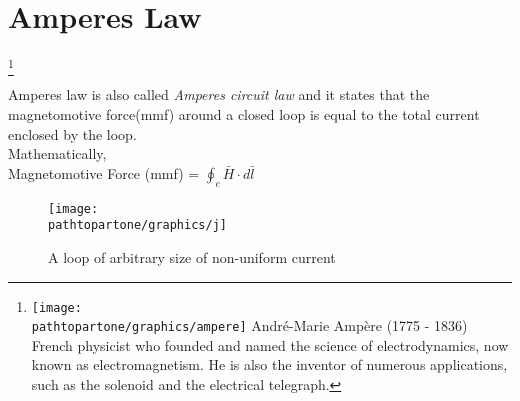 \section{Amperes Law}
\footnote[9]{
\texttt{[image: \\pathtopartone/graphics/ampere]} 
André-Marie Ampère (1775 - 1836) French physicist who founded and named the science of electrodynamics, now known as electromagnetism. He is also the inventor of numerous applications, such as the solenoid and the electrical telegraph.
}

Amperes law is also called \emph{Amperes circuit law} and it states that the magnetomotive force(mmf) around a closed loop is equal to the total current enclosed by the loop.\\
Mathematically, \\
Magnetomotive Force (mmf) = $\oint_c \bar{H} \cdot d\bar{l}$ \\
\begin{figure}[h]
\centering
\texttt{[image: \\pathtopartone/graphics/j]}
\caption{A loop of arbitrary size of non-uniform current}
\label{fig:j}
\end{figure}

